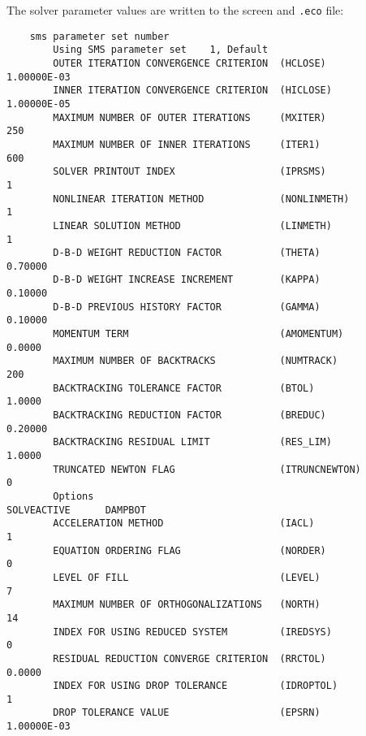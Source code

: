 The solver parameter values are written to the screen and \texttt{.eco} file:
\begin{verbatim}
    sms parameter set number
    	Using SMS parameter set    1, Default
    	OUTER ITERATION CONVERGENCE CRITERION  (HCLOSE)            1.00000E-03
    	INNER ITERATION CONVERGENCE CRITERION  (HICLOSE)           1.00000E-05
    	MAXIMUM NUMBER OF OUTER ITERATIONS     (MXITER)                    250
    	MAXIMUM NUMBER OF INNER ITERATIONS     (ITER1)                     600
    	SOLVER PRINTOUT INDEX                  (IPRSMS)                      1
    	NONLINEAR ITERATION METHOD             (NONLINMETH)                  1
    	LINEAR SOLUTION METHOD                 (LINMETH)                     1
    	D-B-D WEIGHT REDUCTION FACTOR          (THETA)             0.70000
    	D-B-D WEIGHT INCREASE INCREMENT        (KAPPA)             0.10000
    	D-B-D PREVIOUS HISTORY FACTOR          (GAMMA)             0.10000
    	MOMENTUM TERM                          (AMOMENTUM)          0.0000
    	MAXIMUM NUMBER OF BACKTRACKS           (NUMTRACK)                  200
    	BACKTRACKING TOLERANCE FACTOR          (BTOL)               1.0000
    	BACKTRACKING REDUCTION FACTOR          (BREDUC)            0.20000
    	BACKTRACKING RESIDUAL LIMIT            (RES_LIM)            1.0000
    	TRUNCATED NEWTON FLAG                  (ITRUNCNEWTON)                0
    	Options                                                SOLVEACTIVE      DAMPBOT
    	ACCELERATION METHOD                    (IACL)                        1
    	EQUATION ORDERING FLAG                 (NORDER)                      0
    	LEVEL OF FILL                          (LEVEL)                       7
    	MAXIMUM NUMBER OF ORTHOGONALIZATIONS   (NORTH)                      14
    	INDEX FOR USING REDUCED SYSTEM         (IREDSYS)                     0
    	RESIDUAL REDUCTION CONVERGE CRITERION  (RRCTOL)             0.0000
    	INDEX FOR USING DROP TOLERANCE         (IDROPTOL)                    1
    	DROP TOLERANCE VALUE                   (EPSRN)             1.00000E-03
\end{verbatim}
